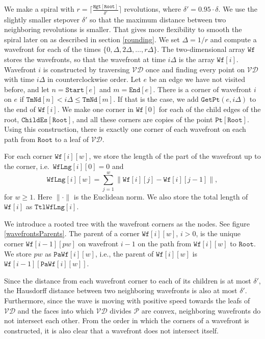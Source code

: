 \documentclass[3p]{elsarticle}
\newcommand{\VD}{\mathcal{VD}}
\newcommand{\PP}{\mathcal{P}}
\newcommand{\stepover}{\delta}
\newcommand{\tStepover}{\Delta}
\newcommand{\childEdges}{\texttt{ChildEs}}
\newcommand{\nodeStart}{\texttt{Start}}
\newcommand{\nodeEnd}{\texttt{End}}
\newcommand{\ttimeO}{\texttt{TmNd}}
\newcommand{\height}{\texttt{Hgt}}
\newcommand{\getPoint}{\texttt{GetPt}}
\newcommand{\wavefront}{\texttt{Wf}}
\newcommand{\wavefrontLength}{\wavefront\texttt{Lng}}
\newcommand{\totalWavefrontLength}{\texttt{Ttl}\wavefrontLength}
\newcommand{\rootNode}{\texttt{Root}}
\newcommand{\point}{\texttt{Pt}}
\newcommand{\parent}{\texttt{Pa}}
\newcommand{\parentWavefrontCorner}{\parent\wavefront}
\begin{document}
We make a spiral with $r=\lceil \frac {\height[\rootNode]}{\stepover'}\rceil$ revolutions, where
$\stepover'=0.95\cdot \stepover$.
We use the slightly smaller stepover $\stepover'$
so that the maximum distance between two neighboring
revolutions is smaller. That gives more flexibility to smooth the spiral later on as described in section \ref{rounding}.
We set $\tStepover=1/r$ and compute a wavefront for each of the times
$\{0,\tStepover,2\tStepover,\ldots,r\tStepover\}$. The two-dimensional array
$\wavefront$ stores the wavefronts, so that the wavefront at time $i\tStepover$ is the array
$\wavefront[i]$. Wavefront $i$ is constructed by traversing $\VD$ once and finding every
point on $\VD$ with time $i\tStepover$ in counterclockwise order.
Let $e$ be an edge we have not visited before, and let $n=\nodeStart[e]$ and
$m=\nodeEnd[e]$. There is a corner of wavefront $i$ on $e$ if
$\ttimeO[n] < i\tStepover \leq\ttimeO[m]$. If that is the case, we add
$\getPoint(e,i\tStepover)$ to the end of $\wavefront[i]$.
We make one corner in $\wavefront[0]$ for each of the child edges of the root,
$\childEdges[\rootNode]$, and all these corners are copies of
the point $\point[\rootNode]$. Using this construction,
there is exactly one corner of each wavefront on each path from
$\rootNode$ to a leaf of $\VD$.

For each corner $\wavefront[i][w]$, we store the length of the part of the
wavefront up to the corner, i.e.~$\wavefrontLength[i][0]=0$ and
$$
\wavefrontLength[i][w]=\sum_{j=1}^{w} \lVert \wavefront[i][j]-\wavefront[i][j-1]\rVert,
$$
for $w\geq 1$. Here $\lVert\cdot\rVert$ is the Euclidean norm. We also store the total length of
$\wavefront[i]$ as $\totalWavefrontLength[i]$.


We introduce a rooted tree with the wavefront corners as the nodes.
See figure \ref{wavefrontsParents}.
The parent of a corner $\wavefront[i][w]$, $i>0$, is the
unique corner $\wavefront[i-1][pw]$ on wavefront $i-1$ on the path from
$\wavefront[i][w]$ to $\rootNode$.
We store $pw$ as $\parentWavefrontCorner[i][w]$, i.e.,
the parent of $\wavefront[i][w]$ is $\wavefront[i-1][\parentWavefrontCorner[i][w]]$.

Since the distance from each wavefront corner to each of its children is at most $\stepover'$,
the Hausdorff distance between two neighboring wavefronts is also at most $\stepover'$.
Furthermore, since the wave is moving with positive speed towards the leafs of $\VD$ and the faces
into which $\VD$ divides $\PP$ are convex, neighboring wavefronts do not intersect each other.
From the order in which the corners of a wavefront is constructed, it is also clear that
a wavefront does not intersect itself.
\end{document}
